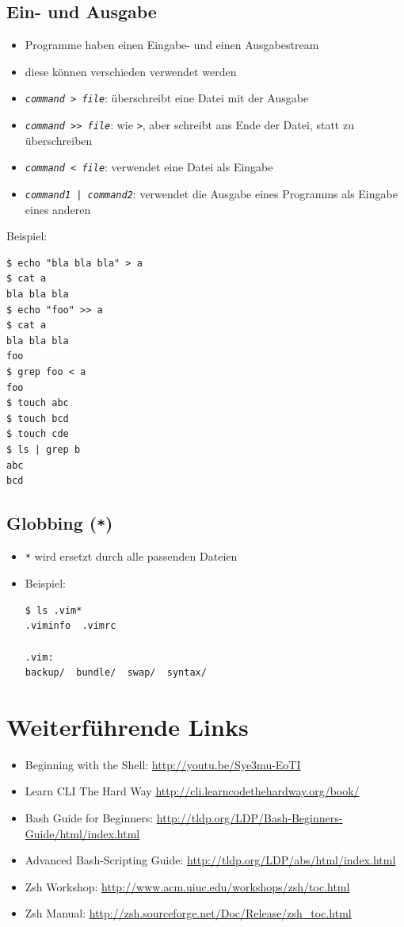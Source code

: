 \subsection{Ein- und Ausgabe}
\begin{itemize}
  \item Programme haben einen Eingabe- und einen Ausgabestream
  \item diese können verschieden verwendet werden
  \item \texttt{\textit{command} > \textit{file}}: überschreibt eine Datei mit der Ausgabe
  \item \texttt{\textit{command} >> \textit{file}}: wie \texttt{>}, aber schreibt ans Ende der Datei, statt zu überschreiben
  \item \texttt{\textit{command} < \textit{file}}: verwendet eine Datei als Eingabe
  \item \texttt{\textit{command1} | \textit{command2}}: verwendet die Ausgabe eines Programms als Eingabe eines anderen
\end{itemize}
Beispiel:
\begin{verbatim}
$ echo "bla bla bla" > a
$ cat a
bla bla bla
$ echo "foo" >> a
$ cat a
bla bla bla
foo
$ grep foo < a
foo
$ touch abc
$ touch bcd
$ touch cde
$ ls | grep b
abc
bcd
\end{verbatim}

\subsection{Globbing (\texttt{*})}
\begin{itemize}
  \item \texttt{*} wird ersetzt durch alle passenden Dateien
  \item Beispiel:
\begin{verbatim}
$ ls .vim*
.viminfo  .vimrc

.vim:
backup/  bundle/  swap/  syntax/
\end{verbatim}
\end{itemize}

\section{Weiterführende Links}
\begin{itemize}
  \item Beginning with the Shell: \url{http://youtu.be/Sye3mu-EoTI}
  \item Learn CLI The Hard Way \url{http://cli.learncodethehardway.org/book/}
  \item Bash Guide for Beginners: \url{http://tldp.org/LDP/Bash-Beginners-Guide/html/index.html}
  \item Advanced Bash-Scripting Guide: \url{http://tldp.org/LDP/abs/html/index.html}
  \item Zsh Workshop: \url{http://www.acm.uiuc.edu/workshops/zsh/toc.html}
  \item Zsh Manual: \url{http://zsh.sourceforge.net/Doc/Release/zsh\_toc.html}
\end{itemize}
